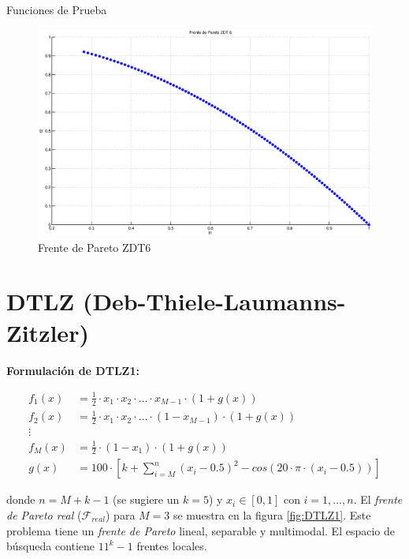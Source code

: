 \begin{chapter}{Funciones de Prueba}
\begin{figure}[h!]
 \centering
\includegraphics[scale=0.45]{ApendiceA/paretoZDT6.eps}
\caption{Frente de Pareto ZDT6}
\label{fig:ZDT6}
\end{figure} 

\section*{DTLZ (Deb-Thiele-Laumanns-Zitzler)} 

\textbf{Formulaci\'on de DTLZ1:}

\begin{align*}
f_1(x)&=\frac{1}{2}\cdot x_1\cdot x_2 \cdot \ldots \cdot x_{M-1} \cdot (1+g(x))\\
f_2(x)&=\frac{1}{2}\cdot x_1\cdot x_2 \cdot \ldots \cdot(1-x_{M-1})\cdot(1+g(x))\\
\vdots&\\
f_M(x)&=\frac{1}{2}\cdot(1-x_1)\cdot(1+g(x))\\
g(x)&=100\cdot[k+\sum_{i=M}^n(x_i-0.5)^2-cos(20\cdot\pi\cdot(x_i-0.5))]
\end{align*}

donde $n=M+k-1$ (se sugiere un $k=5$) y $x_i\in[0,1]$ con $i = 1, \ldots, n$. El \textit{frente de Pareto real} ($\mathcal{F}_{real}$) para $M=3$ se muestra
en la figura \ref{fig:DTLZ1}. Este problema tiene un {\it frente de Pareto}  lineal, separable y multimodal. El espacio de b\'usqueda 
contiene $11^k-1$ frentes locales. 


\end{chapter}
